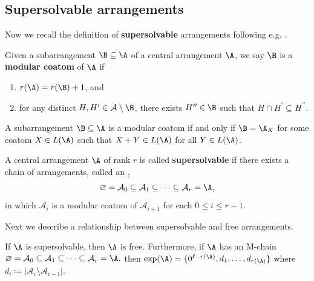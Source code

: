 \subsection{Supersolvable arrangements}
\label{subsec:SS}
Now we recall the definition of \textbf{supersolvable} arrangements following e.g. \cite[\S 2]{ER94}. 
 \begin{definition}
 \label{def:modco}
Given a subarrangement $\B\subseteq \A$ of a central arrangement $\A$, we say $\B$  is  a \textbf{modular coatom} of $\A$ if 
\begin{enumerate}[(1)]
\item $r(\A) = r(\B)+1$, and
\item for any distinct $ H, H^{\prime} \in \mathcal{A}\setminus \B$, there exists $ H^{\prime\prime} \in \B$ such that $ H\cap H^{\prime} \subseteq H^{\prime\prime} $. 
\end{enumerate}
\end{definition}

  \begin{proposition}
 \label{prop:BEZ}
A subarrangement $\B\subseteq \A$ is a modular coatom if and only if $\B = \A_X$ for some coatom $X \in L(\A)$ such that $ X+Y \in L(\A) $ for all $ Y \in L(\A) $. 
 \end{proposition}

 \begin{definition}
 \label{def:supersolvable}
A central arrangement $\A$ of rank $r$ is called \textbf{supersolvable} if there exists a chain of arrangements, called an ,
$$\varnothing  =  \mathcal{A}_{0} \subseteq \mathcal{A}_{1} \subseteq \dots \subseteq \mathcal{A}_{r} = \A,$$
in which $ \mathcal{A}_{{i}} $ is a modular coatom of $ \mathcal{A}_{{i+1}} $ for each $0 \le i \le r-1$. 
\end{definition}

Next we describe a relationship between supersolvable and free arrangements.

 \begin{theorem}[{\cite[Theorem 4.2]{JT84}}]
 \label{thm:exp-ss}
If $\A$ is supersolvable, then $\A$ is free. 
Furthermore, if $\A$ has an \textrm{M}-chain $\varnothing  =  \mathcal{A}_{0} \subseteq \mathcal{A}_{1} \subseteq \dots \subseteq \mathcal{A}_{r} = \A,$ then
$\exp(\A) = \{0^{\ell-r(\A)}, d_1, \ldots, d_{r(\A)}\}$ where $d_i  \coloneqq  | \mathcal{A}_{{i}} \setminus  \mathcal{A}_{{i-1}}|$.
 \end{theorem}
 
